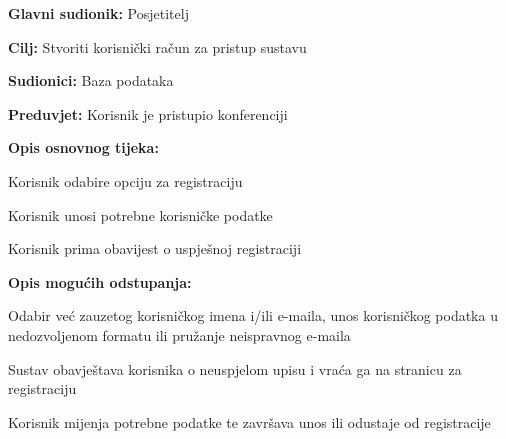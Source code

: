 					\noindent {}
					\begin{packed_item}
					
						\item \textbf{Glavni sudionik: } Posjetitelj
						\item  \textbf{Cilj:} Stvoriti korisnički račun za pristup sustavu
						\item  \textbf{Sudionici:} Baza podataka
						\item  \textbf{Preduvjet:} Korisnik je pristupio konferenciji 
						\item  \textbf{Opis osnovnog tijeka:}
						
						\item[] \begin{packed_enum}
							
							\item Korisnik odabire opciju za registraciju
							\item Korisnik unosi potrebne korisničke podatke
							\item Korisnik prima obavijest o uspješnoj registraciji

						\end{packed_enum}
						
						\item  \textbf{Opis mogućih odstupanja:}
						
						\item[] \begin{packed_item}
							
							\item[2.a] Odabir već zauzetog korisničkog imena i/ili e-maila, unos korisničkog podatka u nedozvoljenom formatu ili pružanje neispravnog e-maila
							\item[] \begin{packed_enum}
								
								\item Sustav obavještava korisnika o neuspjelom upisu i vraća ga na stranicu za registraciju
								\item Korisnik mijenja potrebne podatke te završava unos ili odustaje od registracije
								
							\end{packed_enum}
							
						\end{packed_item}
					\end{packed_item}	
				
